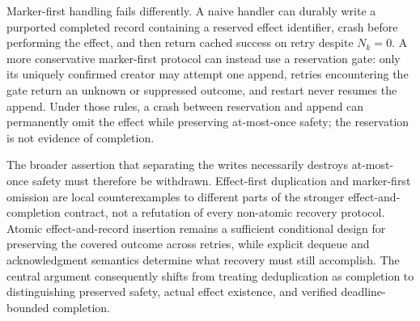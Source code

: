 \documentclass[11pt]{article}
\begin{document}
Marker-first handling fails differently. A naive handler can durably write a purported completed record containing a reserved effect identifier, crash before performing the effect, and then return cached success on retry despite $N_k=0$. A more conservative marker-first protocol can instead use a reservation gate: only its uniquely confirmed creator may attempt one append, retries encountering the gate return an unknown or suppressed outcome, and restart never resumes the append. Under those rules, a crash between reservation and append can permanently omit the effect while preserving at-most-once safety; the reservation is not evidence of completion.

The broader assertion that separating the writes necessarily destroys at-most-once safety must therefore be withdrawn. Effect-first duplication and marker-first omission are local counterexamples to different parts of the stronger effect-and-completion contract, not a refutation of every non-atomic recovery protocol. Atomic effect-and-record insertion remains a sufficient conditional design for preserving the covered outcome across retries, while explicit dequeue and acknowledgment semantics determine what recovery must still accomplish. The central argument consequently shifts from treating deduplication as completion to distinguishing preserved safety, actual effect existence, and verified deadline-bounded completion.
\end{document}
